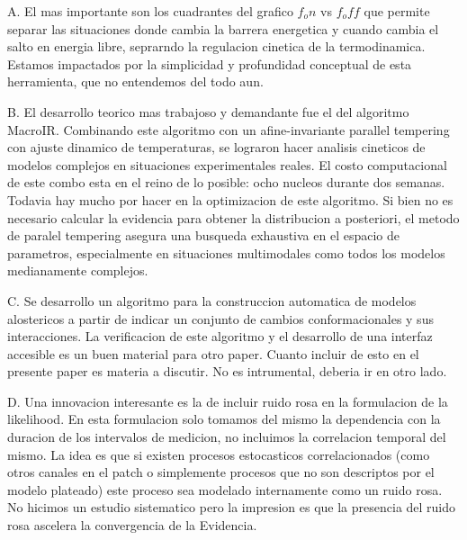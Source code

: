 \documentclass[a4paper,12pt]{article}
\begin{document}
		A. El mas importante son los cuadrantes del grafico $f_on$ vs $f_off$ que permite separar las situaciones donde cambia la barrera energetica y cuando cambia el salto en energia libre, seprarndo la regulacion cinetica de la termodinamica. Estamos impactados por la simplicidad y profundidad conceptual de esta herramienta, que no entendemos del todo aun. 
		
		B. El desarrollo teorico mas trabajoso y demandante fue el del algoritmo MacroIR. Combinando este algoritmo con un afine-invariante parallel tempering con ajuste dinamico de temperaturas, se lograron hacer analisis cineticos de modelos complejos en situaciones experimentales reales. El costo computacional de este combo esta en el reino de lo posible: ocho nucleos durante dos semanas. Todavia hay mucho por hacer en la optimizacion de este algoritmo. 
		Si bien no es necesario calcular la evidencia para obtener la distribucion a posteriori, el metodo de paralel tempering asegura una busqueda exhaustiva en el espacio de parametros, especialmente en situaciones multimodales como todos los modelos medianamente complejos. 
		
		
		C. Se desarrollo un algoritmo para la construccion automatica de modelos alostericos a partir de indicar un conjunto de cambios conformacionales y sus interacciones. La verificacion de este algoritmo y el desarrollo de una interfaz accesible es un buen material para otro paper. Cuanto incluir de esto en el presente paper es materia a discutir. No es intrumental, deberia ir en otro lado. 
		
		D. Una innovacion interesante es la de incluir ruido rosa en la formulacion de la likelihood. En esta formulacion solo tomamos del mismo la dependencia con la duracion de los intervalos de medicion, no incluimos la correlacion temporal del mismo. La idea es que si existen procesos estocasticos correlacionados (como otros canales en el patch o simplemente procesos que no son descriptos por el modelo plateado) este proceso sea modelado internamente como un ruido rosa. No hicimos un estudio sistematico pero la impresion es que la presencia del ruido rosa ascelera la convergencia de la Evidencia. 
		
		
		
		
		
\end{document}
